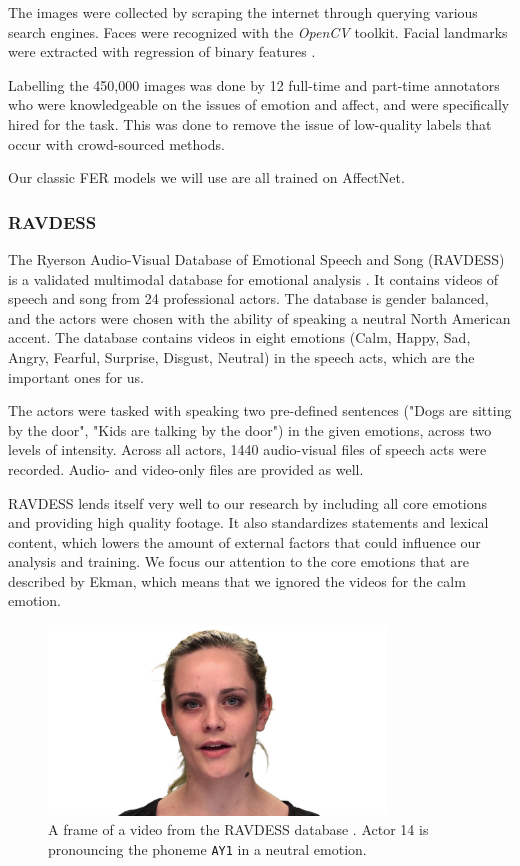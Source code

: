 The images were collected by scraping the internet through querying various search engines. Faces were recognized with the \emph{OpenCV} toolkit. Facial landmarks were extracted with regression of binary features \cite{ren2014face}.

Labelling the 450,000 images was done by 12 full-time and part-time annotators who were knowledgeable on the issues of emotion and affect, and were specifically hired for the task. This was done to remove the issue of low-quality labels that occur with crowd-sourced methods. \cite{mollahosseini2017affectnet}

Our classic FER models we will use are all trained on AffectNet.

\subsubsection{RAVDESS}
\label{sub:ravdess}
The Ryerson Audio-Visual Database of Emotional Speech and Song (RAVDESS) is a validated multimodal database for emotional analysis \cite{livingstone2018ryerson}. It contains videos of speech and song from 24 professional actors. The database is gender balanced, and the actors were chosen with the ability of speaking a neutral North American accent. The database contains videos in eight emotions (Calm, Happy, Sad, Angry, Fearful, Surprise, Disgust, Neutral) in the speech acts, which are the important ones for us.

The actors were tasked with speaking two pre-defined sentences ("Dogs are sitting by the door", "Kids are talking by the door") in the given emotions, across two levels of intensity. Across all actors, 1440 audio-visual files of speech acts were recorded. Audio- and video-only files are provided as well.

RAVDESS lends itself very well to our research by including all core emotions and providing high quality footage. It also standardizes statements and lexical content, which lowers the amount of external factors that could influence our analysis and training. We focus our attention to the core emotions that are described by Ekman, which means that we ignored the videos for the calm emotion.

\begin{figure}
    \centering
    \includegraphics[width=0.8\textwidth]{res/img_ravdess_example_neutral_14AY1.png}
    \caption{A frame of a video from the RAVDESS database \cite{livingstone2018ryerson}. Actor 14 is pronouncing the phoneme \texttt{AY1} in a neutral emotion.}
    \label{fig:ravdess_example}
\end{figure}

